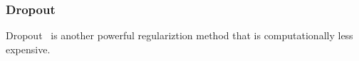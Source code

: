 \subsubsection{Dropout}

Dropout~\cite{JMLR:v15:srivastava14a} is another powerful regulariztion method that is computationally less expensive. 